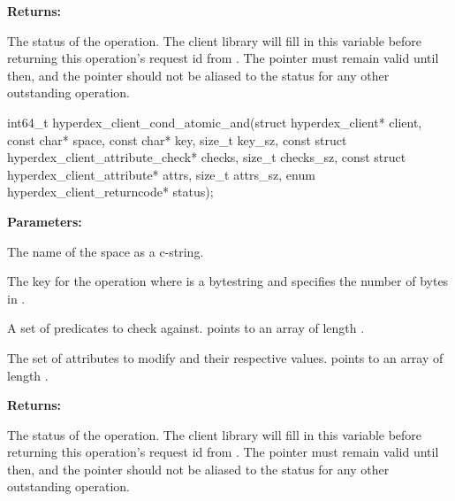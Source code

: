 \noindent\textbf{Returns:}
\begin{description}[labelindent=\widthof{{\code{status}}},leftmargin=*,noitemsep,nolistsep,align=right]
\item[\code{status}] The status of the operation.  The client library will fill in this variable before returning this operation's request id from .  The pointer must remain valid until then, and the pointer should not be aliased to the status for any other outstanding operation.
\end{description}

\funcsep
{}
\begin{ccode}
int64_t hyperdex_client_cond_atomic_and(struct hyperdex_client* client,
                const char* space,
                const char* key, size_t key_sz,
                const struct hyperdex_client_attribute_check* checks, size_t checks_sz,
                const struct hyperdex_client_attribute* attrs, size_t attrs_sz,
                enum hyperdex_client_returncode* status);
\end{ccode}
\funcdesc 

\noindent\textbf{Parameters:}
\begin{description}[labelindent=\widthof{{\code{checks}, \code{checks\_sz}}},leftmargin=*,noitemsep,nolistsep,align=right]
\item[\code{space}] The name of the space as a c-string.
\item[\code{key}, \code{key\_sz}] The key for the operation where  is a bytestring and  specifies the number of bytes in .
\item[\code{checks}, \code{checks\_sz}] A set of predicates to check against.   points to an array of length .
\item[\code{attrs}, \code{attrs\_sz}] The set of attributes to modify and their respective values.   points to an array of length .
\end{description}

\noindent\textbf{Returns:}
\begin{description}[labelindent=\widthof{{\code{status}}},leftmargin=*,noitemsep,nolistsep,align=right]
\item[\code{status}] The status of the operation.  The client library will fill in this variable before returning this operation's request id from .  The pointer must remain valid until then, and the pointer should not be aliased to the status for any other outstanding operation.
\end{description}

